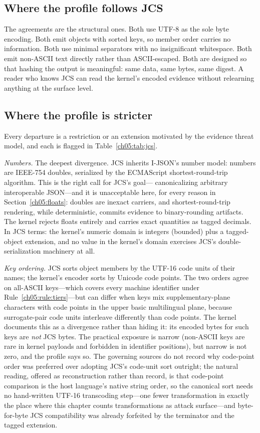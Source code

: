 \subsection{Where the profile follows JCS}

The agreements are the structural ones. Both use UTF-8 as the sole byte
encoding. Both emit objects with sorted keys, so member order carries no
information. Both use minimal separators with no insignificant whitespace.
Both emit non-ASCII text directly rather than ASCII-escaped. Both are
designed so that hashing the output is meaningful: same data, same bytes,
same digest. A reader who knows JCS can read the kernel's encoded evidence
without relearning anything at the surface level.

\subsection{Where the profile is stricter}

Every departure is a restriction or an extension motivated by the evidence
threat model, and each is flagged in Table~\ref{ch05:tab:jcs}.

\emph{Numbers.} The deepest divergence. JCS inherits I-JSON's number
model: numbers are IEEE-754 doubles, serialized by the ECMAScript
shortest-round-trip algorithm. This is the right call for JCS's goal---
canonicalizing arbitrary interoperable JSON---and it is unacceptable
here, for every reason in Section~\ref{ch05:floats}: doubles are inexact
carriers, and shortest-round-trip rendering, while deterministic, commits
evidence to binary-rounding artifacts. The kernel rejects floats entirely
and carries exact quantities as tagged decimals. In JCS terms: the
kernel's numeric domain is integers (bounded) plus a tagged-object
extension, and no value in the kernel's domain exercises JCS's
double-serialization machinery at all.

\emph{Key ordering.} JCS sorts object members by the UTF-16 code units of
their names; the kernel's encoder sorts by Unicode code points. The two
orders agree on all-ASCII keys---which covers every machine identifier
under Rule~\ref{ch05:rule:tiers}---but can differ when keys mix
supplementary-plane characters with code points in the upper basic
multilingual plane, because surrogate-pair code units interleave
differently than code points. The kernel documents this as a divergence
rather than hiding it: its encoded bytes for such keys are \emph{not}
JCS bytes. The practical exposure is narrow (non-ASCII keys are rare in
kernel payloads and forbidden in identifier positions), but narrow is not
zero, and the profile says so. The governing sources do not record why
code-point order was preferred over adopting JCS's code-unit sort
outright; the natural reading, offered as reconstruction rather than
record, is that code-point comparison is the host language's native
string order, so the canonical sort needs no hand-written UTF-16
transcoding step---one fewer transformation in exactly the place where
this chapter counts transformations as attack surface---and
byte-for-byte JCS compatibility was already forfeited by the terminator
and the tagged extension.

